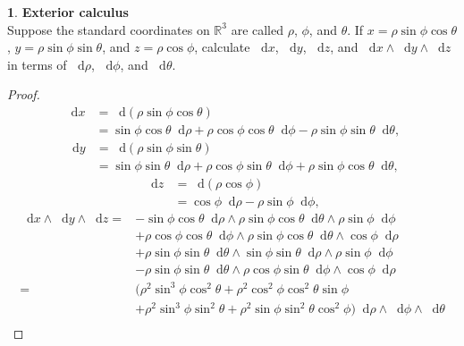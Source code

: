 \documentclass[12pt]{article}
\newcommand{\dd}{\mathop{}\!\mathrm{d}}
\theoremstyle{definition}
\newtheorem{ex}{}[section]
\begin{document}
\begin{ex}
	\textbf{Exterior calculus} \\
	Suppose the standard coordinates on $\mathbb{R}^3$ are called $\rho$, $\phi$, and $\theta$.
	If $x = \rho\sin\phi\cos\theta$, $y = \rho\sin\phi\sin\theta$, and $z = \rho\cos\phi$, calculate $\dd x$, $\dd y$, $\dd z$, and $\dd x\wedge \dd y \wedge \dd z$ in terms of $\dd\rho$, $\dd\phi$, and $\dd\theta$.
\end{ex}
\begin{proof}
	\begin{align*}
		\dd x & = \dd(\rho\sin\phi\cos\theta)                                                                     \\
		      & = \sin\phi\cos\theta \dd\rho + \rho\cos\phi\cos\theta \dd\phi - \rho\sin\phi\sin\theta \dd\theta,
	\end{align*}
	\begin{align*}
		\dd y & = \dd(\rho\sin\phi\sin\theta)                                                                     \\
		      & = \sin\phi\sin\theta \dd\rho + \rho\cos\phi\sin\theta \dd\phi + \rho\sin\phi\cos\theta \dd\theta,
	\end{align*}
	\begin{align*}
		\dd z & = \dd(\rho\cos\phi)                        \\
		      & = \cos\phi \dd\rho - \rho\sin\phi \dd\phi,
	\end{align*}
	\begin{align*}
		\dd x \wedge \dd y \wedge \dd z = {} & - \sin\phi\cos\theta \dd\rho \wedge \rho\sin\phi\cos\theta \dd\theta \wedge \rho\sin\phi \dd\phi                \\
		                                     & + \rho\cos\phi\cos\theta \dd\phi \wedge \rho\sin\phi\cos\theta \dd\theta \wedge \cos\phi \dd\rho                \\
		                                     & + \rho\sin\phi\sin\theta \dd\theta \wedge \sin\phi\sin\theta \dd\rho \wedge \rho\sin\phi \dd\phi                \\
		                                     & - \rho\sin\phi\sin\theta \dd\theta \wedge \rho\cos\phi\sin\theta \dd\phi \wedge \cos\phi \dd\rho                \\
		= {}                                 & (\rho^2\sin^3\phi\cos^2\theta + \rho^2\cos^2\phi\cos^2\theta \sin\phi                                           \\
		                                     & + \rho^2\sin^3\phi\sin^2\theta + \rho^2\sin\phi\sin^2\theta \cos^2\phi) \dd\rho \wedge \dd\phi \wedge \dd\theta \\

\end{align*}
\end{proof}
\end{document}
